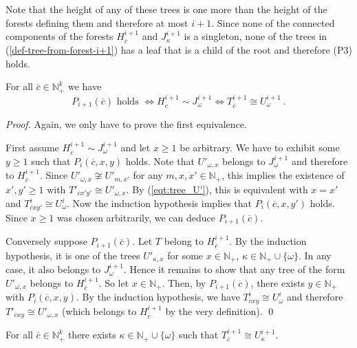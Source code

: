 \documentclass[envcountsame]{llncs}
\newcommand{\N}{\mathbb N}
\begin{document}
Note that the height of any of these trees is one more than the height
of the forests defining them and therefore at most $i+1$. Since none
of the connected components of the forests $H^{i+1}_{\overline c}$ and $J^{i+1}_\kappa$ is a
singleton, none of the trees in (\ref{def-tree-from-forest-i+1}) has a leaf that is a
child of the root and therefore (P3) holds.

\begin{lemma}\label{lem:tree_main1}
  For all $\overline{c} \in \N_+^k$ we have
  \[
    P_{i+1}(\overline{c}) \text{ holds } \iff
     H^{i+1}_{\overline{c}}\sim J^{i+1}_\omega \iff
     T^{i+1}_{\overline{c}}\cong U^{i+1}_\omega\ .
  \]
\end{lemma}

\begin{proof}
  Again, we only have to prove the first equivalence.

  First assume $H^{i+1}_{\overline c}\sim J^{i+1}_\omega$ and let
  $x\ge1$ be arbitrary. We have to exhibit some $y\ge1$ such that
  $P_i(\overline c,x,y)$ holds. Note that $U'_{\omega,x}$ belongs to
  $J^{i+1}_\omega$ and therefore to $H^{i+1}_{\overline c}$. Since
  $U'_{\omega,x}\not\cong U'_{m,x'}$ for any $m,x,x'\in \N_+$, this
  implies the existence of $x',y'\ge1$ with
  $T'_{\overline cx'y'}\cong U'_{\omega,x}$. By (\ref{eqt:tree_U'}), this is
  equivalent with $x=x'$ and $T^i_{\overline cxy'}\cong U^i_\omega$. Now the
  induction hypothesis implies that $P_i(\overline c,x,y')$ holds. Since
  $x\ge1$ was chosen arbitrarily, we can deduce $P_{i+1}(\overline c)$.

  Conversely suppose $P_{i+1}(\overline c)$. Let $T$ belong to
  $H^{i+1}_{\overline c}$. By the induction hypothesis, it is one of
  the trees $U'_{\kappa,x}$ for some $x\in \N_+$, $\kappa\in\N_+\cup\{\omega\}$. In
  any case, it also belongs to $J^{i+1}_\omega$. Hence it remains to
  show that any tree of the form $U'_{\omega,x}$ belongs to
  $H^{i+1}_{\overline c}$. So let $x\in \N_+$. Then, by $P_{i+1}(\overline
  c)$, there exists $y\in\N_+$ with $P_i(\overline c,x,y)$. By the
  induction hypothesis, we have $T^i_{\overline cxy}\cong U^i_\omega$
  and therefore $T'_{\overline cxy}\cong U'_{\omega,x}$ (which belongs
  to $H^{i+1}_{\overline c}$ by the very definition).  \qed
\end{proof}

\begin{lemma}\label{lem:tree_main1a}
  For all $\overline{c} \in \N_+^k$ there exists
  $\kappa \in \N_+\cup\{\omega\}$ such that
  $T^{i+1}_{\overline{c}} \cong  U^{i+1}_\kappa$.
\end{lemma}
\end{document}
